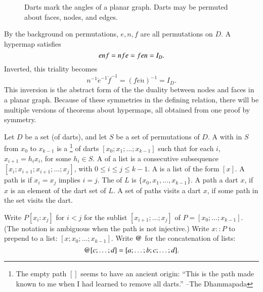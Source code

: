 \begin{figure}[htb]
\centering
{}
\caption{Darts mark the angles of a planar graph.  Darts may
be permuted about faces, nodes, and edges.}
\label{fig:hypermap_ex}
\end{figure}

By the background on permutations, $e,n,f$ are all permutations on $D$.
A hypermap satisfies 
\begin{equation}\tlabel{eqn:triality}
e \ocirc n\ocirc f = n\ocirc f\ocirc e = f\ocirc e\ocirc n = I_D.
\end{equation}
Inverted, this triality becomes
\begin{displaymath}
n^{-1} \ocirc e^{-1} \ocirc f^{-1} = (f \ocirc e \ocirc n)^{-1} = I_D.
\end{displaymath}
This inversion is the abstract form of the the duality between nodes
and faces in a planar graph.  Because of these symmetries in the
defining relation, there will be multiple versions of theorems about
hypermaps, all obtained from one proof by symmetry.


\begin{definition} 
Let $D$ be a set (of darts), and let $S$ be a set of permutations of $D$.
A  with  in $S$
from $x_0$ to $x_{k-1}$ is a \footnote{The empty path $[]$ seems
to have an ancient origin: ``This is the path made known to me
when I had learned to remove all darts.'' --The Dhammapada} of
darts $[x_0;x_1;\ldots;x_{k-1}]$ such that for each $i$, $x_{i+1} = h_i x_i$,
for some $h_i \in S$.   A  of a list is a consecutive
subsequence  $[x_i;x_{i+1};x_{i+1};\ldots;x_j]$, with $0\le i\le j\le k-1$.
A  is a list of the form $[x]$.  A
path is  if $x_i=x_j$ implies $i=j$. 
The  of $L$ is $\{x_0,x_1,\ldots,x_{k-1}\}$.  A path 
a dart $x$, if $x$ is an element of the dart set of $L$.  A set of paths visits a
dart $x$, if some path in the set visits the dart.
\end{definition}

\begin{notation}[$::$,~$\opat$]
Write $P[x_i:x_j]$ for $i<j$ for the sublist $[x_{i+1};\ldots;x_j]$ of
$P=[x_0;\ldots;x_{k-1}]$.  (The notation is ambiguous when the path is
not injective.)  Write $x::P$ to prepend to a list:
$[x;x_0;\ldots;x_{k-1}]$.  Write $\opat$ for the concatenation of
lists:
\begin{displaymath}
[a;\ldots;b] \opat [c;\ldots;d]  = [a;\ldots;b;c;\ldots;d].
\end{displaymath}
\end{notation}
%
%
%


